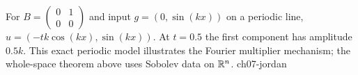 \Needspace{55mm}

{For $B=\left(\begin{smallmatrix}0&1\\0&0\end{smallmatrix}\right)$ and input $g=(0,\sin(kx))$ on a periodic line, $u=(-tk\cos(kx),\sin(kx))$. At $t=0.5$ the first component has amplitude $0.5k$. This exact periodic model illustrates the Fourier multiplier mechanism; the whole-space theorem above uses Sobolev data on $\mathbb{R}^n$.}
{ch07-jordan}
